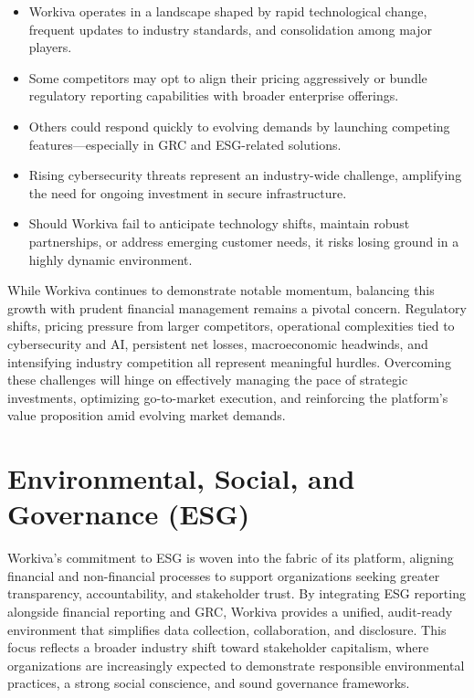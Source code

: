 \documentclass[
  10pt,
  a4paper,
]{article}
\providecommand{\tightlist}{%
  \setlength{\itemsep}{0pt}\setlength{\parskip}{0pt}}\usepackage{longtable,booktabs,array}
\begin{document}
\begin{itemize}
  \begin{itemize}
  \tightlist
  \item
    Workiva operates in a landscape shaped by rapid technological
    change, frequent updates to industry standards, and consolidation
    among major players.
  \item
    Some competitors may opt to align their pricing aggressively or
    bundle regulatory reporting capabilities with broader enterprise
    offerings.
  \item
    Others could respond quickly to evolving demands by launching
    competing features---especially in GRC and ESG-related solutions.
  \item
    Rising cybersecurity threats represent an industry-wide challenge,
    amplifying the need for ongoing investment in secure infrastructure.
  \item
    Should Workiva fail to anticipate technology shifts, maintain robust
    partnerships, or address emerging customer needs, it risks losing
    ground in a highly dynamic environment.
  \end{itemize}
\end{itemize}

While Workiva continues to demonstrate notable momentum, balancing this
growth with prudent financial management remains a pivotal concern.
Regulatory shifts, pricing pressure from larger competitors, operational
complexities tied to cybersecurity and AI, persistent net losses,
macroeconomic headwinds, and intensifying industry competition all
represent meaningful hurdles. Overcoming these challenges will hinge on
effectively managing the pace of strategic investments, optimizing
go-to-market execution, and reinforcing the platform's value proposition
amid evolving market demands.

\section{Environmental, Social, and Governance
(ESG)}\label{environmental-social-and-governance-esg}

Workiva's commitment to ESG is woven into the fabric of its platform,
aligning financial and non-financial processes to support organizations
seeking greater transparency, accountability, and stakeholder trust. By
integrating ESG reporting alongside financial reporting and GRC, Workiva
provides a unified, audit-ready environment that simplifies data
collection, collaboration, and disclosure. This focus reflects a broader
industry shift toward stakeholder capitalism, where organizations are
increasingly expected to demonstrate responsible environmental
practices, a strong social conscience, and sound governance frameworks.
\end{document}
